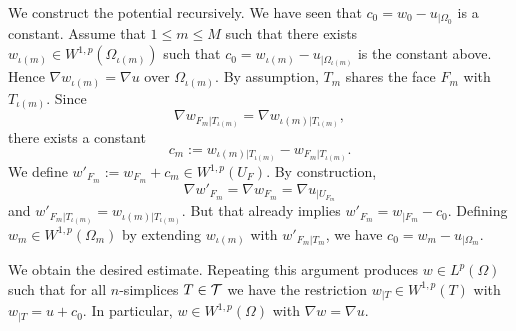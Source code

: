\documentclass[a4paper]{article}
\begin{document}
 We construct the potential recursively. 
 We have seen that $c_{0} = w_{0} - u_{|\Omega_{0}}$ is a constant. 
 Assume that $1 \leq m \leq M$ such that there exists $w_{\iota(m)} \in W^{1,p}(\Omega_{\iota(m)})$ 
 such that $c_{0} = w_{\iota(m)} - u_{|\Omega_{\iota(m)}}$ is the constant above. 
 Hence $\nabla w_{\iota(m)} = \nabla u$ over $\Omega_{\iota(m)}$. 
 By assumption, $T_{m}$ shares the face $F_{m}$ with $T_{{\iota(m)}}$. 
 Since $$\nabla w_{F_{m}|T_{{\iota(m)}}} = \nabla w_{\iota(m)|T_{{\iota(m)}}},$$
 there exists a constant $$c_{m} := w_{\iota(m)|T_{{\iota(m)}}} - w_{F_{m}|T_{{\iota(m)}}}.$$
 We define $w'_{F_m} := w_{F_m} + c_{m} \in W^{1,p}(U_F)$.
 By construction, $$\nabla w'_{F_m} = \nabla w_{F_m} = \nabla u_{|U_{F_m}}$$ 
 and 
 $w'_{F_{m}|T_{{\iota(m)}}} = w_{\iota(m)|T_{{\iota(m)}}}$. 
 But that already implies $w'_{F_m} = w_{|F_m} - c_{0}$. 
 Defining $w_{m} \in W^{1,p}(\Omega_m)$ by extending $w_{\iota(m)}$ with $w'_{F_m|T_m}$,
 we have $c_{0} = w_{m} - u_{|\Omega_{m}}$. 

  
 
 We obtain the desired estimate. 
 Repeating this argument produces $w \in L^{p}(\Omega)$ 
 such that for all $n$-simplices $T \in {\mathcal T}$ we have the restriction $w_{|T} \in W^{1,p}(T)$ with $w_{|T} = u + c_{0}$.
 In particular, $w \in W^{1,p}(\Omega)$ with $\nabla w = \nabla u$.
 
 
 
 
 
 
 
 
 
 
\end{document}
